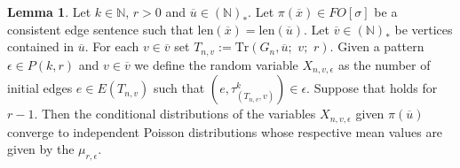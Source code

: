 \documentclass[12pt,notitlepage,a4paper]{article}
\theoremstyle{definition}
\newtheorem{lemma}{Lemma}[section]
\newcommand{\N}{\mathbb{N}}
\newcommand{\Tr}{\mathrm{Tr}}
\newcommand{\len}{\mathrm{len}}
\begin{document}
\begin{lemma}\label{lem:poisedges}
	Let $k\in \N$, $r>0$ and $\overline{u}\in (\N)_*$.
	Let $\pi(\overline{x})\in FO[\sigma]$ be a consistent
	edge sentence such that 
	$\len(\overline{x})=\len(\overline{u})$.
	Let $\overline{v}\in (\N)_*$ be vertices contained
	in $\overline{u}$. For each $v\in \overline{v}$
	set $T_{n,v}:= \Tr\left(G_n, \overline{u};\,\,v;\,\,r\right)$.
	Given a pattern $\epsilon\in P(k,r)$ and $v\in \overline{v}$
	we define the random variable $X_{n,v,\epsilon}$ as
	the number of initial edges $e\in E(T_{n,v})$ such 
	that $(e,\tau^k_{(T_{n,v},v)})\in \epsilon$. Suppose that
	 holds for $r-1$. Then the conditional 
	distributions of the variables $X_{n,v,\epsilon}$ given
	$\pi(\overline{u})$ converge to independent Poisson distributions
	whose respective mean values are given by the $\mu_{r,\epsilon}$. 
\end{lemma}
\end{document}
